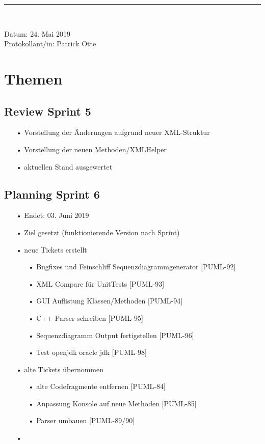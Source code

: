 \begin{center}  
\vspace{0.5pt}\nointerlineskip\rule{\textwidth}{0.2pt}\\ 
\vspace{0.5pt}\nointerlineskip
\end{center} 
\large Datum: 24. Mai 2019\vspace{3pt}\\\large Protokollant/in: Patrick Otte
\section*{Themen}
\subsection*{Review Sprint 5}
\begin{itemize}
\item[•] Vorstellung der Änderungen aufgrund neuer XML-Struktur
\item[•] Vorstellung der neuen Methoden/XMLHelper
\item[•] aktuellen Stand ausgewertet
\end{itemize}
\subsection*{Planning Sprint 6}
\begin{itemize}
\item[•] Endet: 03. Juni 2019
\item[•] Ziel gesetzt (funktionierende Version nach Sprint)
\item[•] neue Tickets erstellt
\begin{itemize}
\item[•] Bugfixes und Feinschliff Sequenzdiagrammgenerator [PUML-92]
\item[•] XML Compare für UnitTests [PUML-93]
\item[•] GUI Auflistung Klassen/Methoden [PUML-94]
\item[•] C++ Parser schreiben [PUML-95]
\item[•] Sequenzdiagramm Output fertigstellen [PUML-96]
\item[•] Test openjdk oracle jdk [PUML-98]
\end{itemize}
\item[•] alte Tickets übernommen
\begin{itemize}
\item[•] alte Codefragmente entfernen [PUML-84]
\item[•] Anpassung Konsole auf neue Methoden [PUML-85]
\item[•] Parser umbauen [PUML-89/90]
\end{itemize}
\item[•] 
\end{itemize}
